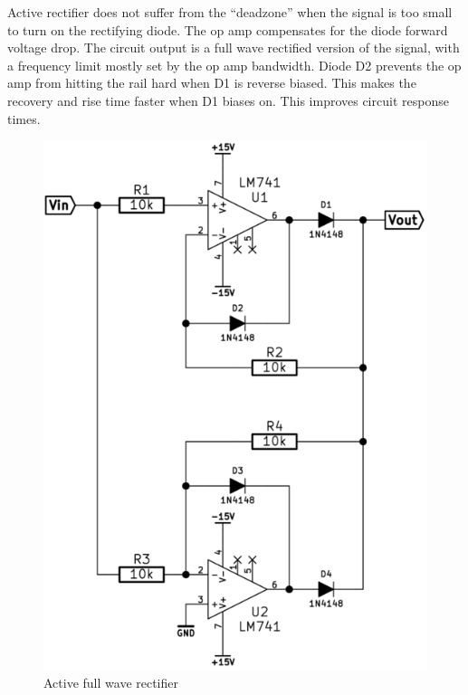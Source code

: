 \documentclass[]{article}
\begin{document}
Active rectifier does not suffer from the ``deadzone'' when the signal
is too small to turn on the rectifying diode. The op amp compensates for
the diode forward voltage drop. The circuit output is a full wave
rectified version of the signal, with a frequency limit mostly set by
the op amp bandwidth. Diode D2 prevents the op amp from hitting the rail
hard when D1 is reverse biased. This makes the recovery and rise time
faster when D1 biases on. This improves circuit response times.

\begin{figure}[htbp]
\centering
\includegraphics[scale=0.5]{img/fwr.png}
\caption{Active full wave rectifier}
\end{figure}
\end{document}
